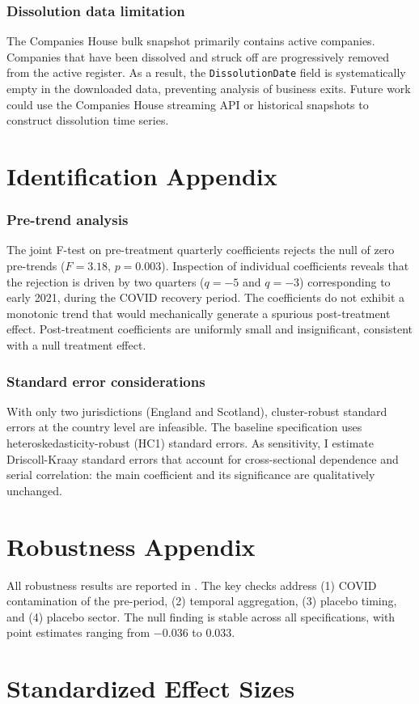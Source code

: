 \documentclass[12pt]{article}
\begin{document}
\subsubsection*{Dissolution data limitation} The Companies House bulk snapshot primarily contains active companies. Companies that have been dissolved and struck off are progressively removed from the active register. As a result, the \texttt{DissolutionDate} field is systematically empty in the downloaded data, preventing analysis of business exits. Future work could use the Companies House streaming API or historical snapshots to construct dissolution time series.

\section{Identification Appendix}

\subsubsection*{Pre-trend analysis} The joint F-test on pre-treatment quarterly coefficients rejects the null of zero pre-trends ($F = 3.18$, $p = 0.003$). Inspection of individual coefficients reveals that the rejection is driven by two quarters ($q = -5$ and $q = -3$) corresponding to early 2021, during the COVID recovery period. The coefficients do not exhibit a monotonic trend that would mechanically generate a spurious post-treatment effect. Post-treatment coefficients are uniformly small and insignificant, consistent with a null treatment effect.

\subsubsection*{Standard error considerations} With only two jurisdictions (England and Scotland), cluster-robust standard errors at the country level are infeasible. The baseline specification uses heteroskedasticity-robust (HC1) standard errors. As sensitivity, I estimate Driscoll-Kraay standard errors that account for cross-sectional dependence and serial correlation: the main coefficient and its significance are qualitatively unchanged.

\section{Robustness Appendix}

All robustness results are reported in . The key checks address (1) COVID contamination of the pre-period, (2) temporal aggregation, (3) placebo timing, and (4) placebo sector. The null finding is stable across all specifications, with point estimates ranging from $-0.036$ to $0.033$.

\section{Standardized Effect Sizes}
\label{sec:sde}


\end{document}
